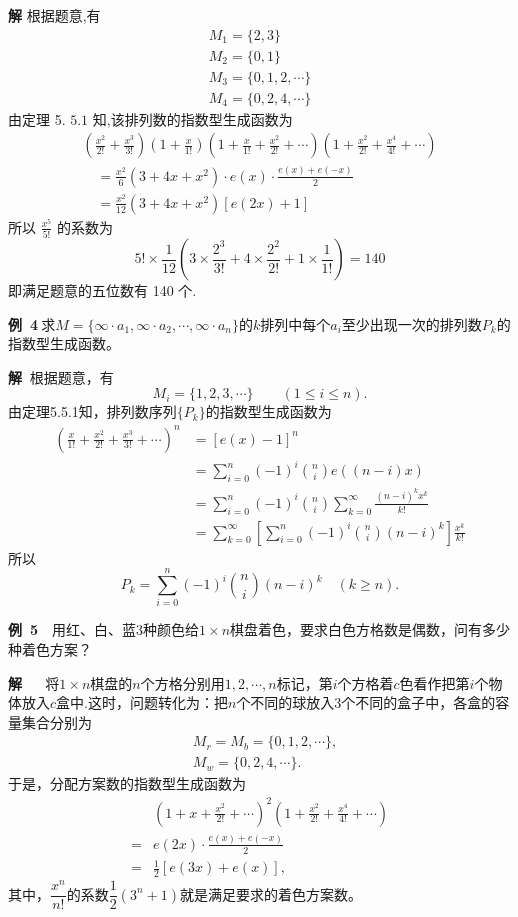 \documentclass{report}
\begin{document}
\textbf{解  }根据题意,有
$$
\begin{array}{l}
{M}_{1}=\{2,3\} \\
{M}_{2}=\{0,1\} \\
{M}_{3}=\{0,1,2, \cdots\} \\
{M}_{4}=\{0,2,4, \cdots\}
\end{array}
$$
由定理 5. $5.1$ 知,该排列数的指数型生成函数为
$$
\begin{array}{l}
\left(\frac{x^{2}}{2 !}+\frac{x^{3}}{3 !}\right)\left(1+\frac{x}{1 !}\right)\left(1+\frac{x}{1 !}+\frac{x^{2}}{2 !}+\cdots\right)\left(1+\frac{x^{2}}{2 !}+\frac{x^{4}}{4 !}+\cdots\right) \\
\quad=\frac{x^{2}}{6}\left(3+4 x+x^{2}\right) \cdot e(x) \cdot \frac{e(x)+e(-x)}{2} \\
\quad=\frac{x^{2}}{12}\left(3+4 x+x^{2}\right)[e(2 x)+1]
\end{array}
$$
所以 $\frac{x^{5}}{5 !}$ 的系数为
$$
5 ! \times \frac{1}{12}\left(3 \times \frac{2^{3}}{3 !}+4 \times \frac{2^{2}}{2 !}+1 \times \frac{1}{1 !}\right)=140
$$
即满足题意的五位数有 140 个.

\noindent
\textbf{例\ 4}$\ $求$M=\{\infty\cdot a_{1},\infty\cdot a_{2},\cdots,\infty\cdot a_{n} \}$的$k$排列中每个$a_{i}$至少出现一次的排列数$P_{k}$的指数型生成函数。

\textbf{解  }$\ $根据题意，有$$M_{i}=\{1,2,3,\cdots\} \quad\quad (1\leq i\leq n).$$
由定理5.5.1知，排列数序列$\{P_{k}\}$的指数型生成函数为
$$\begin{aligned}
	\left(\frac{x}{1 !}+\frac{x^{2}}{2 !}+\frac{x^{3}}{3 !}+\cdots\right)^{n} &=[e(x)-1]^{n} \\
	&=\sum_{i=0}^{n}(-1)^{i}\binom{n}{i} e((n-i) x) \\
	&=\sum_{i=0}^{n}(-1)^{i}\binom{n}{i}\sum_{k=0}^{\infty} \frac{(n-i)^{k} x^{k}}{k !} \\
	&=\sum_{k=0}^{\infty}\left[\sum_{i=0}^{n}(-1)^{i}\binom{n}{i}(n-i)^{k}\right] \frac{x^{k}}{k !} 
\end{aligned}$$
所以
$$	P_{k}=\sum_{i=0}^{n}(-1)^{i}\binom{n}{i}(n-i)^{k} \quad(k \geq n).$$

\noindent
\textbf{例\ 5}$\quad$用红、白、蓝3种颜色给$1\times n$棋盘着色，要求白色方格数是偶数，问有多少种着色方案？

\textbf{解  }$\quad$ 将$1\times n$棋盘的$n$个方格分别用$1,2,\cdots,n$标记，第$i$个方格着$c$色看作把第$i$个物体放入$c$盒中.这时，问题转化为：把$n$个不同的球放入3个不同的盒子中，各盒的容量集合分别为
\[
\begin{aligned}
&M_{r}=M_{b}=\{0,1,2, \cdots\}, \\
&M_{w}=\{0,2,4, \cdots\} .
\end{aligned}
\]于是，分配方案数的指数型生成函数为\[
\begin{aligned}
&(1+x+\frac{x^{2}}{2 !}+\cdots)^{2}\left(1+\frac{x^{2}}{2 !}+\frac{x^{4}}{4 !}+\cdots\right) \\
=&e(2 x) \cdot \frac{e(x)+e(-x)}{2} \\
=&\frac{1}{2}[e(3 x)+e(x)],
\end{aligned}
\]其中，$\dfrac{x^{n}}{n!}$的系数$ \dfrac{1}{2}(3^{n}+1) $就是满足要求的着色方案数。
\end{document}
